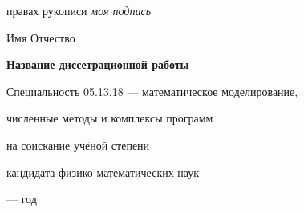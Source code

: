 \fontsize{14pt}{15pt}\selectfont  %
\thispagestyle{empty}

\vspace{10mm}
\begin{flushright}
   правах рукописи
  \textit{моя подпись}
\end{flushright}

\vspace{30mm}
\begin{center}
{\Large{} Имя Отчество}
\end{center}

\vspace{30mm}
\begin{center}
{\bf \LARGE Название диссетрационной работы
\par}

\vspace{30mm}
{\Large
Специальность 05.13.18 --- математическое моделирование,\par
численные методы и комплексы программ
}

\vspace{15mm}
\par
{} на соискание учёной степени\par
кандидата физико-математических наук
\end{center}

\vspace{40mm}
\begin{center}
{ --- год}
\end{center}

\newpage

